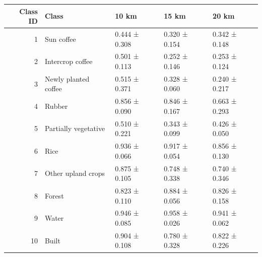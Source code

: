\begin{tabular}{rllll}
\toprule
Class ID & Class & 10 km & 15 km & 20 km \\
\midrule
1 & Sun coffee & 0.444 ± 0.308 & 0.320 ± 0.154 & 0.342 ± 0.148 \\
2 & Intercrop coffee & 0.501 ± 0.113 & 0.252 ± 0.146 & 0.253 ± 0.124 \\
3 & Newly planted coffee & 0.515 ± 0.371 & 0.328 ± 0.060 & 0.240 ± 0.217 \\
4 & Rubber & 0.856 ± 0.090 & 0.846 ± 0.167 & 0.663 ± 0.293 \\
5 & Partially vegetative & 0.510 ± 0.221 & 0.343 ± 0.099 & 0.426 ± 0.050 \\
6 & Rice & 0.936 ± 0.066 & 0.917 ± 0.054 & 0.856 ± 0.130 \\
7 & Other upland crops & 0.875 ± 0.105 & 0.748 ± 0.338 & 0.740 ± 0.346 \\
8 & Forest & 0.823 ± 0.110 & 0.884 ± 0.056 & 0.826 ± 0.158 \\
9 & Water & 0.946 ± 0.085 & 0.958 ± 0.026 & 0.941 ± 0.062 \\
10 & Built & 0.904 ± 0.108 & 0.780 ± 0.328 & 0.822 ± 0.226 \\
\bottomrule
\end{tabular}
